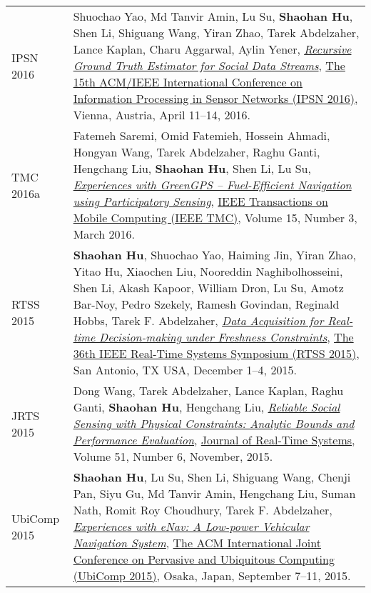 \begin{longtabu}{p{.51\sectionwidth} p{.78\resumewidth}}
{\sc IPSN 2016}\hypertarget{yao2016ipsn}{} &
Shuochao Yao, Md Tanvir Amin, Lu Su, \textbf{Shaohan Hu}, Shen Li, Shiguang Wang, Yiran Zhao, Tarek Abdelzaher, Lance Kaplan, Charu Aggarwal, Aylin Yener,
\href{http://ieeexplore.ieee.org/document/7460719}{\emph{Recursive Ground Truth Estimator for Social Data Streams}},
\href{http://ipsn.acm.org/2016/}{\textsf{The 15th ACM/IEEE International Conference on Information Processing in Sensor Networks (IPSN 2016)}},
Vienna, Austria, April 11--14, 2016. \\

{\sc TMC 2016a}\hypertarget{saremi2016tmc}{} &
Fatemeh Saremi, Omid Fatemieh, Hossein Ahmadi, Hongyan Wang, Tarek Abdelzaher, Raghu Ganti, Hengchang Liu, \textbf{Shaohan Hu}, Shen Li, Lu Su,
\href{http://ieeexplore.ieee.org/document/7084108}{\emph{Experiences with GreenGPS -- Fuel-Efficient Navigation using Participatory Sensing}},
\href{http://www.computer.org/web/tmc}{\textsf{IEEE Transactions on Mobile Computing (IEEE TMC)}},
Volume 15, Number 3, March 2016. \\

{\sc RTSS 2015}\hypertarget{hu2015rtss}{} &
\textbf{Shaohan Hu}, Shuochao Yao, Haiming Jin, Yiran Zhao, Yitao Hu, Xiaochen Liu, Nooreddin Naghibolhosseini, Shen Li, Akash Kapoor, William Dron, Lu Su, Amotz Bar-Noy, Pedro Szekely, Ramesh Govindan, Reginald Hobbs, Tarek F. Abdelzaher,
\href{http://ieeexplore.ieee.org/document/7383576}{\emph{Data Acquisition for Real-time Decision-making under Freshness Constraints}},
\href{http://2015.rtss.org/}{\textsf{The 36th IEEE Real-Time Systems Symposium (RTSS 2015)}},
San Antonio, TX USA, December 1--4, 2015. \\

{\sc JRTS 2015}\hypertarget{wang2015jrts}{} &
Dong Wang, Tarek Abdelzaher, Lance Kaplan, Raghu Ganti, \textbf{Shaohan Hu}, Hengchang Liu,
\href{https://link.springer.com/article/10.1007/s11241-015-9238-8}{\emph{Reliable Social Sensing with Physical Constraints: Analytic Bounds and Performance Evaluation}},
\href{http://link.springer.com/journal/11241}{\textsf{Journal of Real-Time Systems}},
Volume 51, Number 6, November, 2015. \\

{\sc UbiComp 2015}\hypertarget{hu2015ubicomp}{} &
\textbf{Shaohan Hu}, Lu Su, Shen Li, Shiguang Wang, Chenji Pan, Siyu Gu, Md Tanvir Amin, Hengchang Liu, Suman Nath, Romit Roy Choudhury, Tarek F. Abdelzaher,
\href{http://dl.acm.org/citation.cfm?id=2804287}{\emph{Experiences with eNav: A Low-power Vehicular Navigation System}},
\href{http://ubicomp.org/ubicomp2015/}{\textsf{The ACM International Joint Conference on Pervasive and Ubiquitous Computing (UbiComp 2015)}},
Osaka, Japan, September 7--11, 2015. \\


\end{longtabu}
